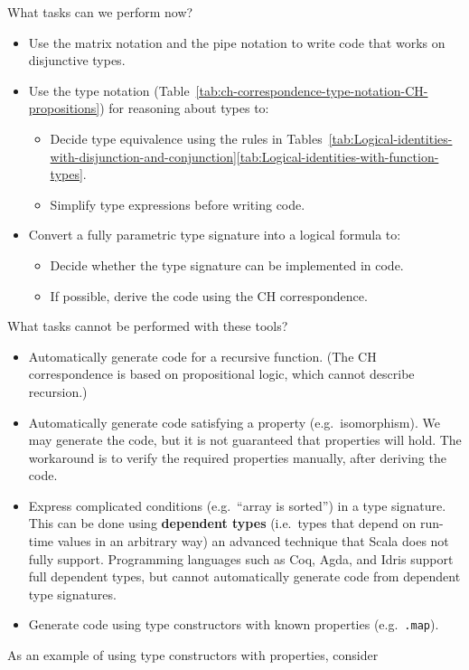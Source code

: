 What tasks can we perform now?
\begin{itemize}
\item Use the matrix notation and the pipe notation to write code that works
on disjunctive types.
\item Use the type notation (Table~\ref{tab:ch-correspondence-type-notation-CH-propositions})
for reasoning about types to:
\begin{itemize}
\item Decide type equivalence using the rules in Tables~\ref{tab:Logical-identities-with-disjunction-and-conjunction}\textendash \ref{tab:Logical-identities-with-function-types}.
\item Simplify type expressions before writing code.
\end{itemize}
\item Convert a fully parametric type signature into a logical formula to:
\begin{itemize}
\item Decide whether the type signature can be implemented in code.
\item If possible, derive the code using the CH correspondence.
\end{itemize}
\end{itemize}
What tasks cannot be performed with these tools?
\begin{itemize}
\item Automatically generate code for a recursive function. (The CH correspondence
is based on propositional logic, which cannot describe recursion.)
\item Automatically generate code satisfying a property (e.g.\ isomorphism).
We may generate the code, but it is not guaranteed that properties
will hold. The workaround is to verify the required properties manually,
after deriving the code.
\item Express complicated conditions (e.g.\ ``array is sorted'') in a
type signature. This can be done using \textbf{dependent types}
(i.e.~types that depend on run-time values in an arbitrary way) \textendash{}
an advanced technique that Scala does not fully support. Programming
languages such as Coq, Agda, and Idris support full dependent types,
but cannot automatically generate code from dependent type signatures.
\item Generate code using type constructors with known properties (e.g.\ \lstinline!.map!).
\end{itemize}
As an example of using type constructors with properties, consider
